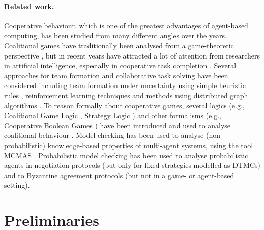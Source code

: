 \documentclass{llncs}
\begin{document}
\paragraph{Related work.} Cooperative behaviour, which is one of the greatest advantages of agent-based computing, has been studied from many different angles over the years.
Coalitional games have traditionally been analysed from a game-theoretic perspective \cite{osborne1994course}, but in recent years have attracted a lot of attention from researchers in artificial intelligence, especially in cooperative task completion \cite{shehory1998methods}.
Several approaches for team formation and collaborative task solving have been considered including team formation under uncertainty using simple heuristic rules \cite{kraus2003coalition}, reinforcement learning techniques \cite{abdallah2004organization} and methods using distributed graph algorithms \cite{manisterski2006forming}.
To reason formally about cooperative games, several logics (e.g., Coalitional Game Logic \cite{agotnes2009reasoning}, Strategy Logic \cite{chatterjee2007strategy}) and other formalisms (e.g., Cooperative Boolean Games \cite{dunne2008cooperative}) have been introduced and used to analyse coalitional behaviour \cite{bonzon2007efficient}.
Model checking has been used to analyse (non-probabilistic) knowledge-based properties of multi-agent systems,
using the tool MCMAS \cite{lomuscio2006mcmas}.
Probabilistic model checking has been used to
analyse probabilistic agents in negotiation protocols \cite{BFW06b}
(but only for fixed strategies modelled as DTMCs)
and to Byzantine agreement protocols \cite{KN02}
(but not in a game- or agent-based setting).



\section{Preliminaries}

\end{document}

